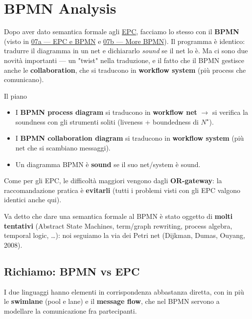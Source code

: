 \chapter{\texorpdfstring{BPMN Analysis}{BPMN Analysis}}
\label{ch:16b}

Dopo aver dato semantica formale agli \hyperref[ch:16a]{EPC}, facciamo lo stesso con il \textbf{BPMN} (visto in \hyperref[ch:07a]{07a — EPC e BPMN} e \hyperref[ch:07b]{07b — More BPMN}). Il programma è identico: tradurre il diagramma in un net e dichiararlo \emph{sound} se il net lo è. Ma ci sono due novità importanti — un "twist" nella traduzione, e il fatto che il BPMN gestisce anche le \textbf{collaboration}, che si traducono in \textbf{workflow system} (più process che comunicano).

\begin{boxabstract}{Il piano}
\begin{itemize}
\item I \textbf{BPMN process diagram} si traducono in \textbf{workflow net} $\rightarrow$ si verifica la soundness con gli strumenti soliti (liveness + boundedness di $N^\star$).
\item I \textbf{BPMN collaboration diagram} si traducono in \textbf{workflow system} (più net che si scambiano messaggi).
\item Un diagramma BPMN è \textbf{sound} se il suo net/system è sound.
\end{itemize}

Come per gli EPC, le difficoltà maggiori vengono dagli \textbf{OR-gateway}: la raccomandazione pratica è \textbf{evitarli} (tutti i problemi visti con gli EPC valgono identici anche qui).
\end{boxabstract}

Va detto che dare una semantica formale al BPMN è stato oggetto di \textbf{molti tentativi} (Abstract State Machines, term/graph rewriting, process algebra, temporal logic, …): noi seguiamo la via dei Petri net (Dijkman, Dumas, Ouyang, 2008).

\section{\texorpdfstring{Richiamo: BPMN vs EPC}{Richiamo: BPMN vs EPC}}

I due linguaggi hanno elementi in corrispondenza abbastanza diretta, con in più le \textbf{swimlane} (pool e lane) e il \textbf{message flow}, che nel BPMN servono a modellare la comunicazione fra partecipanti.

